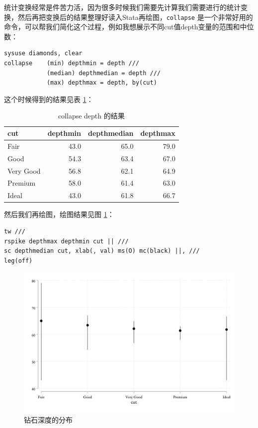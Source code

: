 统计变换经常是件苦力活，因为很多时候我们需要先计算我们需要进行的统计变换，然后再把变换后的结果整理好读入Stata再绘图，\lstinline{collapse} 是一个非常好用的命令，可以帮我们简化这个过程，例如我想展示不同cut值depth变量的范围和中位数：

\begin{lstlisting}
sysuse diamonds, clear
collapse    (min) depthmin = depth ///
            (median) depthmedian = depth ///
            (max) depthmax = depth, by(cut)
\end{lstlisting}

这个时候得到的结果见表 \ref{tab:depthmmm}：

\begin{table}[htbp]
\caption{\label{tab:depthmmm}collapse depth 的结果}
\centering
\begin{tabular}{lrrr}
\toprule
cut & depthmin & depthmedian & depthmax\\
\midrule
Fair & 43.0 & 65.0 & 79.0\\
Good & 54.3 & 63.4 & 67.0\\
Very Good & 56.8 & 62.1 & 64.9\\
Premium & 58.0 & 61.4 & 63.0\\
Ideal & 43.0 & 61.8 & 66.7\\
\bottomrule
\end{tabular}
\end{table}

然后我们再绘图，绘图结果见图 \ref{fig:depth3m}：

\begin{lstlisting}
tw ///
rspike depthmax depthmin cut || ///
sc depthmedian cut, xlab(, val) ms(O) mc(black) ||, ///
leg(off)
\end{lstlisting}

\begin{figure}[htbp]
  \centering \includegraphics[width=\textwidth]{assets/depth3m.png}
  \caption{钻石深度的分布}
  \label{fig:depth3m}
\end{figure}

